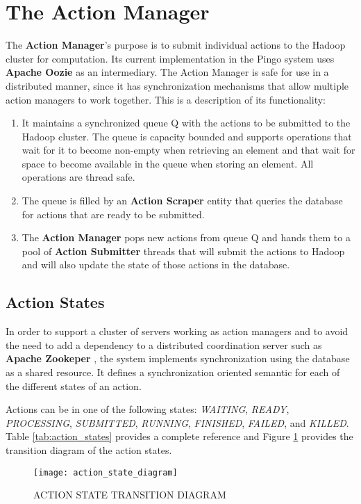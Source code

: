 \section{The Action Manager}
The \textbf{Action Manager}'s purpose is to submit individual actions to the Hadoop cluster for computation. Its current implementation in the Pingo system uses \textbf{Apache Oozie} \citep{islam2012oozie} as an intermediary. The Action Manager is safe for use in a distributed manner, since it has synchronization mechanisms that allow multiple action managers to work together.  This is a description of its functionality:
\begin{enumerate}
\item It maintains a synchronized queue Q with the actions to be submitted to the Hadoop cluster. The queue is capacity bounded and supports operations that wait for it to become non-empty when retrieving an element and that wait for space to become available in the queue when storing an element. All operations are thread safe.
\item The queue is filled by an \textbf{Action Scraper} entity that queries the database for actions that are ready to be submitted.
\item The \textbf{Action Manager} pops new actions from queue Q and hands them to a pool of \textbf{Action Submitter} threads that will submit the actions to Hadoop and will also update the state of those actions in the database.
\end{enumerate}

\subsection{Action States}
In order to support a cluster of servers working as action managers and to avoid the need to add a dependency to a distributed coordination server such as \textbf{Apache Zookeper} \citep{zookeper}, the system implements synchronization using the database as a shared resource.  It defines a synchronization oriented semantic for each of the different states of an action.

Actions can be in one of the following states: \textit{WAITING}, \textit{READY}, \textit{PROCESSING}, \textit{SUBMITTED}, \textit{RUNNING}, \textit{FINISHED}, \textit{FAILED}, and \textit{KILLED}.  Table \ref{tab:action_states} provides a complete reference and Figure \ref{fig:action_transition_diagram} provides the transition diagram of the action states.

\begin{figure}
\centering
\texttt{[image: action\_state\_diagram]}
\caption{ACTION STATE TRANSITION DIAGRAM}
\label{fig:action_transition_diagram}
\end{figure}

